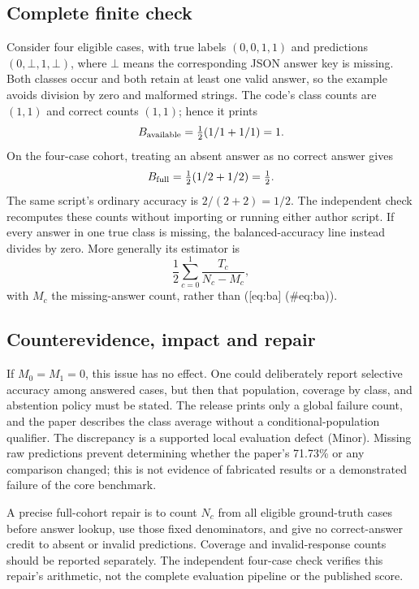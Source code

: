 \documentclass[10pt]{article}
\begin{document}
\subsection*{Complete finite check}
Consider four eligible cases, with true labels \((0,0,1,1)\) and predictions \((0,\bot,1,\bot)\), where \(\bot\) means the corresponding JSON answer key is missing. Both classes occur and both retain at least one valid answer, so the example avoids division by zero and malformed strings. The code’s class counts are \((1,1)\) and correct counts \((1,1)\); hence it prints \[B_{\rm available}=\tfrac12(1/1+1/1)=1.\] On the four-case cohort, treating an absent answer as no correct answer gives \[B_{\rm full}=\tfrac12(1/2+1/2)=\tfrac12.\] The same script’s ordinary accuracy is \(2/(2+2)=1/2\). The independent check recomputes these counts without importing or running either author script. If every answer in one true class is missing, the balanced-accuracy line instead divides by zero. More generally its estimator is \[\frac12\sum_{c=0}^1\frac{T_c}{N_c-M_c},\] with \(M_c\) the missing-answer count, rather than ([eq:ba] (\#eq:ba)).\par
\subsection*{Counterevidence, impact and repair}
If \(M_0=M_1=0\), this issue has no effect. One could deliberately report selective accuracy among answered cases, but then that population, coverage by class, and abstention policy must be stated. The release prints only a global failure count, and the paper describes the class average without a conditional-population qualifier. The discrepancy is a supported local evaluation defect (Minor). Missing raw predictions prevent determining whether the paper’s 71.73\% or any comparison changed; this is not evidence of fabricated results or a demonstrated failure of the core benchmark.\par
A precise full-cohort repair is to count \(N_c\) from all eligible ground-truth cases before answer lookup, use those fixed denominators, and give no correct-answer credit to absent or invalid predictions. Coverage and invalid-response counts should be reported separately. The independent four-case check verifies this repair’s arithmetic, not the complete evaluation pipeline or the published score.\par
\end{document}
